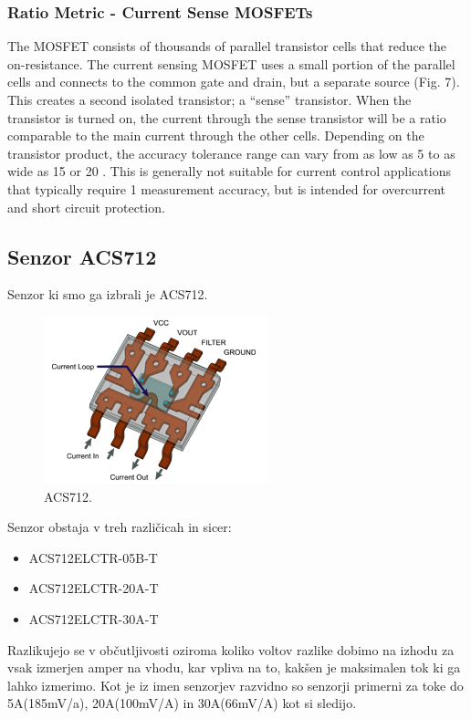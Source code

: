\documentclass[12pt,a4paper,titlepage,openany]{report}
\begin{document}
\subsubsection{Ratio Metric - Current Sense MOSFETs}
The MOSFET consists of thousands of parallel transistor cells that reduce the on-resistance. The current sensing MOSFET uses
a small portion of the parallel cells and connects to the common gate and drain, but a separate source (Fig. 7). This creates a
second isolated transistor; a “sense” transistor. When the transistor is turned on, the current through the sense transistor will
be a ratio comparable to the main current through the other cells.
Depending on the transistor product, the accuracy tolerance range can vary from as low as 5  to as wide as 15  or 20 .
This is generally not suitable for current control applications that typically require 1  measurement accuracy, but is intended
for overcurrent and short circuit protection.

\subsection{Senzor ACS712}
Senzor ki smo ga izbrali je ACS712.


\begin{figure}[H]
\begin{center}
\includegraphics[width=0.5\linewidth]{Slike/ACS712.jpg}
\end{center}
\caption{ACS712.}\label{slika:ACS712}
\end{figure}

Senzor obstaja v treh različicah in sicer:

\begin{itemize}
\item ACS712ELCTR-05B-T
\item ACS712ELCTR-20A-T
\item ACS712ELCTR-30A-T
\end{itemize}

Razlikujejo se v občutljivosti oziroma koliko voltov razlike dobimo na izhodu za vsak izmerjen amper na vhodu, kar vpliva na to, kakšen je maksimalen tok ki ga lahko izmerimo. Kot je iz imen senzorjev razvidno so senzorji primerni za toke do 5A(185mV/a), 20A(100mV/A) in 30A(66mV/A) kot si sledijo.
\end{document}
